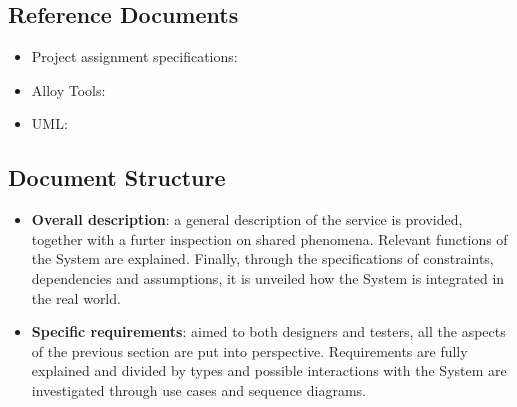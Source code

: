 \subsection{Reference Documents}

\begin{itemize}
    \item Project assignment specifications:\cite{ASSIGNMENT}
    \item Alloy Tools: \cite{ALLOY}
    \item UML: \cite{UML}
\end{itemize}

\subsection{Document Structure}

\begin{itemize}
    \item \textbf{Overall description}: a general description of the 
    service is provided, together with a furter inspection on shared 
    phenomena. Relevant functions of the System are explained. 
    Finally, through the specifications of constraints, dependencies 
    and assumptions, it is unveiled how the System is integrated 
    in the real world.
    \item \textbf{Specific requirements}: aimed to both designers 
    and testers, all the aspects of the previous section are put 
    into perspective. Requirements are fully explained and divided 
    by types and possible interactions with the System are investigated 
    through use cases and sequence diagrams.
\end{itemize}
